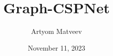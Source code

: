 \documentclass{beamer}
\title[Week 7]{Graph-CSPNet} %
\author{Artyom Matveev} %
\institute[MIPT] %
{
Moscow Institute of Physics and Technology \\ %
\medskip
\textit{matveev.as@phystech.edu} %
}
\date{November 11, 2023} %
\begin{document}
{
\begin{frame}
\titlepage %
\end{frame}
}



%
\end{document}

